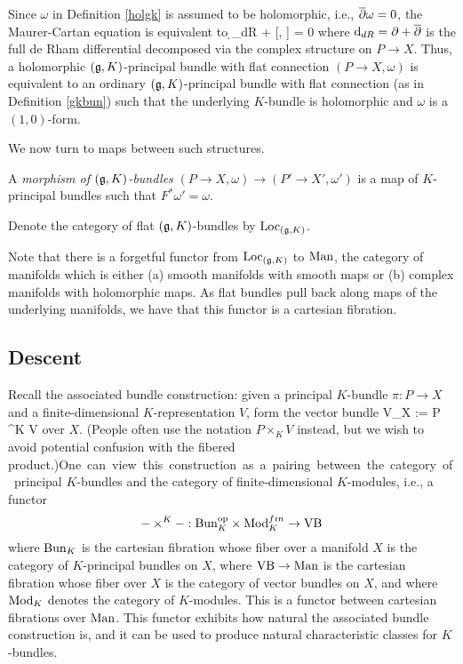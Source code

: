\begin{rmk} 
Since $\omega$ in Definition \ref{holgk} is assumed to be holomorphic, i.e., $\overline{\partial} \omega = 0$, 
the Maurer-Cartan equation is equivalent to 
\ben
\d_{dR} \omega +  [\omega, \omega] = 0
\een 
where ${\rm d}_{dR} = \partial + \overline{\partial}$ is the full de Rham differential decomposed via the complex structure on $P \to X$. 
Thus, a holomorphic $(\mathfrak g,K)$-principal bundle with flat connection $(P \to X, \omega)$ is equivalent to 
an ordinary $(\mathfrak g,K)$-principal bundle with flat connection (as in Definition \ref{gkbun}) such that 
the underlying $K$-bundle is holomorphic and $\omega$ is a $(1,0)$-form.
\end{rmk}

We now turn to maps between such structures.

\begin{dfn}
A {\em morphism of $(\mathfrak g,K)$-bundles} $(P \to X, \omega) \to (P' \to X', \omega')$ is a map of $K$-principal bundles
\ben
{}
\een
such that $F^* \omega' = \omega$. 

Denote the category of flat $(\mathfrak g,K)$-bundles by ${\rm Loc}_{(\mathfrak g,K)}$. 
\end{dfn}

Note that there is a forgetful functor from  ${\rm Loc}_{(\mathfrak g,K)}$ to ${\rm
  Man}$, the category of manifolds which is either (a) smooth manifolds
with smooth maps or (b) complex manifolds with holomorphic maps. As flat bundles pull back along maps of the underlying manifolds,
we have that this functor is a cartesian fibration.

\subsection{Descent}

Recall the associated bundle construction: given a principal $K$-bundle $\pi : P \to X$ and a finite-dimensional $K$-representation $V$, form the vector bundle
\ben
V_X := P \times^K V
\een
over $X$. 
(People often use the notation $P\times_K V$ instead, but we wish to avoid potential confusion with the fibered product.)\si

One can view this construction as a pairing between the category of principal $K$-bundles and the category of finite-dimensional $K$-modules, i.e., a functor
\[
- \times^K - : {\rm Bun}_K^{{\rm op}} \times {\rm Mod}_K^{fin} \to {\rm VB}
\]
where ${\rm Bun}_K$ is the cartesian fibration whose fiber over a manifold $X$ is the category of $K$-principal bundles on $X$,
where ${\rm VB} \to {\rm Man}$ is the cartesian fibration whose fiber over $X$ is the category of vector bundles on $X$, and 
where ${\rm Mod}_K$ denotes the category of $K$-modules. This is a functor
between cartesian fibrations over ${\rm Man}$. This functor exhibits how natural the associated bundle construction is, and 
it can be used to produce natural characteristic classes for $K$-bundles.

